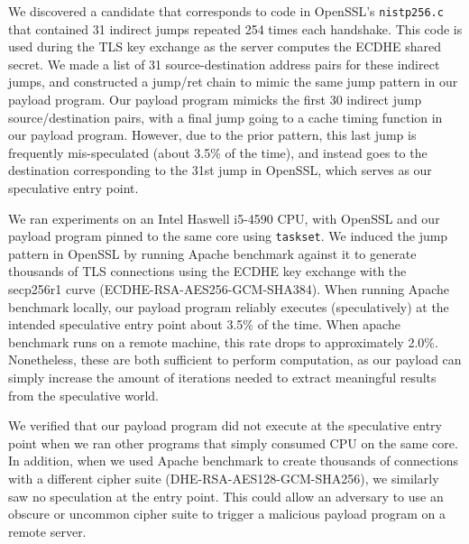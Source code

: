 We discovered a candidate that corresponds to code in OpenSSL's
\texttt{nistp256.c} that contained 31 indirect jumps repeated 254 times each
handshake. This code is used during the TLS key exchange as the server computes
the ECDHE shared secret. We made a list of 31 source-destination address pairs
for these indirect jumps, and constructed a jump/ret chain to mimic the same
jump pattern in
our payload program. Our payload program mimicks the first 30 indirect jump
source/destination pairs, with a final jump going to a cache timing function
in our payload program. However, due to the prior pattern, this last jump is
frequently mis-speculated (about 3.5\% of the time), and instead goes to the
destination corresponding to the 31st jump in OpenSSL, which serves as our
speculative entry point.


We ran experiments on an Intel Haswell
i5-4590 CPU, with OpenSSL and our payload program pinned to the same core using
\texttt{taskset}.
We induced the jump pattern in OpenSSL by running Apache benchmark against it to
generate thousands of TLS connections using the ECDHE key exchange with the
secp256r1 curve (ECDHE-RSA-AES256-GCM-SHA384). When running Apache benchmark locally, our payload program
reliably executes (speculatively) at the intended speculative entry point
about 3.5\% of the time. When apache benchmark runs on a remote
machine, this rate drops to approximately 2.0\%. Nonetheless, these are both
sufficient to perform computation, as our payload can simply increase the amount
of iterations needed to extract meaningful results from the speculative world.

We verified that our payload program did not execute at the speculative entry
point when we ran
other programs that simply consumed CPU on the same core. In addition, when we used
Apache benchmark to create thousands of connections with a different cipher
suite (DHE-RSA-AES128-GCM-SHA256), we similarly saw no speculation at the entry point. This
could allow an adversary to use an obscure or uncommon cipher suite to trigger a
malicious \speculake payload program on a remote server.



